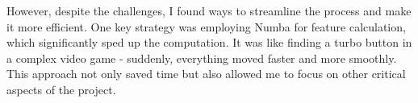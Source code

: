 \documentclass[12pt]{article}
\newtheorem{Proof of Lemma}{Proof of Lemma}
\begin{document}
However, despite the challenges, I found ways to streamline the process and make it more efficient. One key strategy was employing Numba for feature calculation, which significantly sped up the computation. It was like finding a turbo button in a complex video game - suddenly, everything moved faster and more smoothly. This approach not only saved time but also allowed me to focus on other critical aspects of the project.


\end{document}
